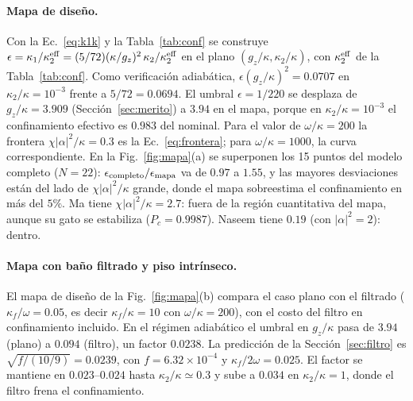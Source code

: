 \documentclass[11pt,a4paper]{article}
\theoremstyle{definition}
\begin{document}
\paragraph{Mapa de diseño.} Con la Ec.~\eqref{eq:k1k} y la Tabla~\ref{tab:conf} se construye $\epsilon=\kappa_1/\kappa_2^{\rm eff}=(5/72)(\kappa/g_z)^2\,\kappa_2/\kappa_2^{\rm eff}$ en el plano $(g_z/\kappa,\kappa_2/\kappa)$, con $\kappa_2^{\rm eff}$ de la Tabla~\ref{tab:conf}. Como verificación adiabática, $\epsilon(g_z/\kappa)^2=0.0707$ en $\kappa_2/\kappa=10^{-3}$ frente a $5/72=0.0694$. El umbral $\epsilon=1/220$ se desplaza de $g_z/\kappa=3.909$ (Sección~\ref{sec:merito}) a $3.94$ en el mapa, porque en $\kappa_2/\kappa=10^{-3}$ el confinamiento efectivo es $0.983$ del nominal. Para el valor de $\omega/\kappa=200$ la frontera $\chi|\alpha|^2/\kappa=0.3$ es la Ec.~\eqref{eq:frontera}; para $\omega/\kappa=1000$, la curva correspondiente. En la Fig.~\ref{fig:mapa}(a) se superponen los 15 puntos del modelo completo ($N=22$): $\epsilon_{\rm completo}/\epsilon_{\rm mapa}$ va de $0.97$ a $1.55$, y las mayores desviaciones están del lado de $\chi|\alpha|^2/\kappa$ grande, donde el mapa sobreestima el confinamiento en más del $5\%$. Ma tiene $\chi|\alpha|^2/\kappa=2.7$: fuera de la región cuantitativa del mapa, aunque su gato se estabiliza ($P_c=0.9987$). Naseem tiene $0.19$ (con $|\alpha|^2=2$): dentro.


\paragraph{Mapa con baño filtrado y piso intrínseco.} El mapa de diseño de la Fig.~\ref{fig:mapa}(b) compara el caso plano con el filtrado ($\kappa_f/\omega=0.05$, es decir $\kappa_f/\kappa=10$ con $\omega/\kappa=200$), con el costo del filtro en confinamiento incluido. En el régimen adiabático el umbral en $g_z/\kappa$ pasa de $3.94$ (plano) a $0.094$ (filtro), un factor $0.0238$. La predicción de la Sección~\ref{sec:filtro} es $\sqrt{f/(10/9)}=0.0239$, con $f=6.32\times10^{-4}$ y $\kappa_f/2\omega=0.025$. El factor se mantiene en $0.023$--$0.024$ hasta $\kappa_2/\kappa\simeq0.3$ y sube a $0.034$ en $\kappa_2/\kappa=1$, donde el filtro frena el confinamiento.
\end{document}
